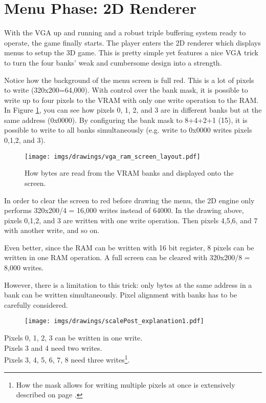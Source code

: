 \section{Menu Phase: 2D Renderer}
With the VGA up and running and a robust triple buffering system ready to operate, the game finally starts. The player enters the 2D renderer which displays menus to setup the 3D game. This is pretty simple yet features a nice VGA trick to turn the four banks' weak and cumbersome design into a strength.
\par
\begin{figure}[H]
\centering
{}
\end{figure}
\par

Notice how the background of the menu screen is full red. This is a lot of pixels to write (320x200=64,000). With control over the bank mask, it is possible to write up to four pixels to the VRAM with only one write operation to the RAM. In Figure \ref{vga_layout_1}, you can see how pixels 0, 1, 2, and 3 are in different banks but at the same address (0x0000). By configuring the bank mask to 8+4+2+1 (15), it is possible to write to all banks simultaneously (e.g. write to 0x0000 writes pixels 0,1,2, and 3).\\
\par
\begin{figure}[H]
\centering
\texttt{[image: imgs/drawings/vga\_ram\_screen\_layout.pdf]}
\caption{How bytes are read from the VRAM banks and displayed onto the screen.}
\label{vga_layout_1}
\end{figure}

\par
In order to clear the screen to red before drawing the menu, the 2D engine only performs 320x200/4 = 16,000 writes instead of 64000. In the drawing above, pixels 0,1,2, and 3 are written with one write operation. Then pixels 4,5,6, and 7 with another write, and so on.\\
\par
Even better, since the RAM can be written with 16 bit register, 8 pixels can be written in one RAM operation. A full screen can be cleared with 320x200/8 = 8,000 writes.
\par
\begin{minipage}{\textwidth}

\end{minipage}
However, there is a limitation to this trick: only bytes at the same address in a bank can be written simultaneously. Pixel alignment with banks has to be carefully considered.\
\par
\begin{figure}[H]
\centering
 \texttt{[image: imgs/drawings/scalePost\_explanation1.pdf]}
 
 \end{figure}
Pixels 0, 1, 2, 3 can be written in one write.\\
Pixels 3 and 4 need two writes.\\
Pixels 3, 4, 5, 6, 7, 8 need three writes\footnote{How the mask allows for writing multiple pixels at once is extensively described on page \pageref{simd_vga}.}.\\


